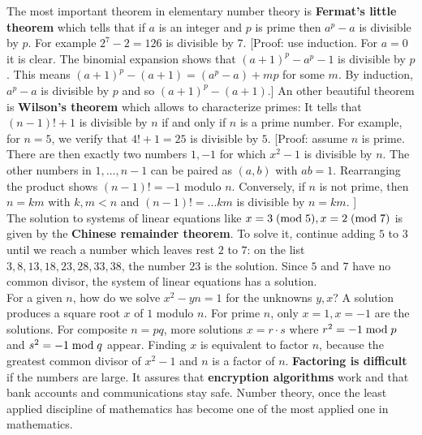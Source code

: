 \documentclass[12pt]{amsart}
\newcounter{example}    \def\example#1{ \item \fontsize{12}{15} \selectfont #1 \fontsize{12}{15} \selectfont }
\begin{document}
The most important theorem in elementary number theory is {\bf Fermat's little theorem} which tells that
if $a$ is an integer and $p$ is prime then $a^{p} - a$ is divisible by $p$.
For example $2^7 -2 = 126$ is divisible by $7$. [Proof: use induction. For $a=0$ it is clear.
The binomial expansion shows that $(a+1)^p-a^p-1$ is divisible by $p$. 
This means $(a+1)^p - (a+1) = (a^p-a) + m p$ for some $m$. By induction, $a^p-a$ is divisible by $p$ and so $(a+1)^p - (a+1)$.] 
An other beautiful theorem is {\bf Wilson's theorem} which allows to characterize primes: 
It tells that $(n-1)!+1$ is divisible by $n$ if and only if 
$n$ is a prime number. For example, for $n=5$, we verify that $4!+1=25$ is divisible by $5$.
[Proof: assume $n$ is prime. There are then exactly two numbers $1,-1$ for which $x^2-1$ is divisible by $n$. 
The other numbers in $1,\dots,n-1$ can be paired as $(a,b)$ with $a b=1$. Rearranging the product 
shows $(n-1)!=-1$ modulo $n$. Conversely, if $n$ is not prime, then $n=k m$ with $k,m<n$ and 
$(n-1)! = ... k m$ is divisible by $n=k m$. ] \\
The solution to systems of linear equations like $x=3 \; ({\rm mod} \; 5), x=2 \; ({\rm mod} \; 7)$ is given by 
the {\bf Chinese remainder theorem}. To solve it, continue adding $5$ to $3$ until we reach a 
number which leaves rest $2$ to $7$: on the list $3,8,13,18,23,28,33,38$, the number $23$ is
the solution. Since $5$ and $7$ have no common divisor, the system of linear equations has
a solution.  \\
For a given $n$, how do we solve $x^2 - y n =1$ for the unknowns $y,x$?
A solution produces a square root $x$ of $1$ modulo $n$. For prime $n$, 
only $x=1,x=-1$ are the solutions. For composite $n=pq$, more solutions $x=r \cdot s$ where
$r^2=-1 \; {\rm mod} \;  p$ and $s^2=-1 \; {\rm mod} \;  q$ appear. Finding $x$ is equivalent to 
factor $n$, because the greatest common divisor of $x^2-1$ and $n$ is a factor of $n$. 
{\bf Factoring is difficult} if the numbers are large. It assures that {\bf encryption algorithms} 
work and that bank accounts and communications stay safe. Number theory, once the least applied 
discipline of mathematics has become one of the most applied one in mathematics. 

 \pagebreak
{}
\end{document}
